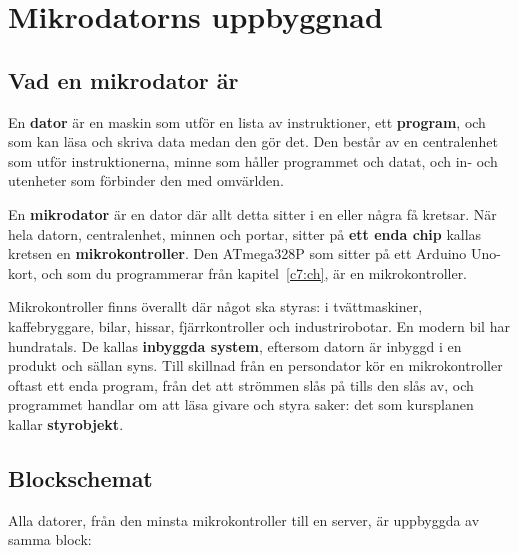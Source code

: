 %

\section{Mikrodatorns uppbyggnad}
\label{c6:app:b}

\subsection{Vad en mikrodator är}
\label{c6:b1}
En \textbf{dator} är en maskin som utför en lista av instruktioner, ett \textbf{program}, och som
kan läsa och skriva data medan den gör det. Den består av en centralenhet som utför
instruktionerna, minne som håller programmet och datat, och in- och utenheter som förbinder den med
omvärlden.

En \textbf{mikrodator} är en dator där allt detta sitter i en eller några få kretsar. När hela
datorn, centralenhet, minnen och portar, sitter på \textbf{ett enda chip} kallas kretsen en
\textbf{mikrokontroller}. Den ATmega328P som sitter på ett Arduino Uno-kort, och som du
programmerar från kapitel~\ref{c7:ch}, är en mikrokontroller.

Mikrokontroller finns överallt där något ska styras: i tvättmaskiner, kaffebryggare, bilar, hissar,
fjärrkontroller och industrirobotar. En modern bil har hundratals. De kallas \textbf{inbyggda
system}, eftersom datorn är inbyggd i en produkt och sällan syns. Till skillnad från en persondator
kör en mikrokontroller oftast ett enda program, från det att strömmen slås på tills den slås av,
och programmet handlar om att läsa givare och styra saker: det som kursplanen kallar
\textbf{styrobjekt}.

\subsection{Blockschemat}
\label{c6:b2}
Alla datorer, från den minsta mikrokontroller till en server, är uppbyggda av samma block:


